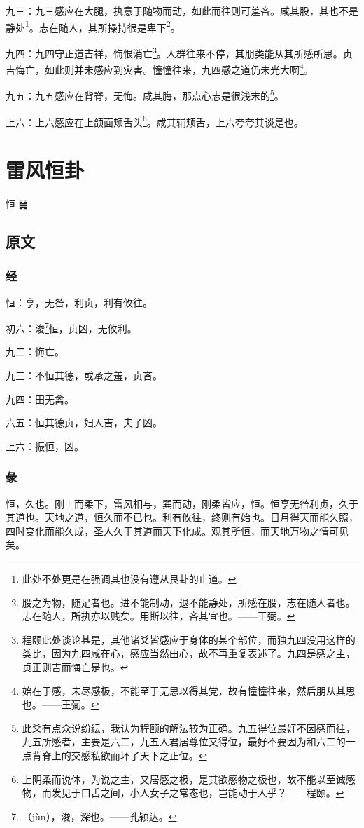 \documentclass[12pt,oneside]{book}
\begin{document}
九三：九三感应在大腿，执意于随物而动，如此而往则可羞吝。咸其股，其也不是静处\footnote{此处不处更是在强调其也没有遵从艮卦的止道。}。志在随人，其所操持很是卑下\footnote{股之为物，随足者也。进不能制动，退不能静处，所感在股，志在随人者也。志在随人，所执亦以贱矣。用斯以往，吝其宜也。——王弼。}。

九四：九四守正道吉祥，悔恨消亡\footnote{程颐此处谈论甚是，其他诸爻皆感应于身体的某个部位，而独九四没用这样的类比，因为九四咸在心，感应当然由心，故不再重复表述了。九四是感之主，贞正则吉而悔亡是也。}。人群往来不停，其朋类能从其所感所思。贞吉悔亡，如此则并未感应到灾害。憧憧往来，九四感之道仍未光大啊\footnote{始在于感，未尽感极，不能至于无思以得其党，故有憧憧往来，然后朋从其思也。——王弼。}。

九五：九五感应在背脊，无悔。咸其脢，那点心志是很浅末的\footnote{此爻有点众说纷纭，我认为程颐的解法较为正确。九五得位最好不因感而往，九五所感者，主要是六二，九五人君居尊位又得位，最好不要因为和六二的一点背脊上的交感私欲而坏了天下之正位。}。

上六：上六感应在上颌面颊舌头\footnote{上阴柔而说体，为说之主，又居感之极，是其欲感物之极也，故不能以至诚感物，而发见于口舌之间，小人女子之常态也，岂能动于人乎？——程颐。}。咸其辅颊舌，上六夸夸其谈是也。

\chapter{雷风恒卦}
恒 {\Large ䷟}

\section{原文}

\subsection{经}
恒：亨，无咎，利贞，利有攸往。

初六：浚\footnote{（jùn），浚，深也。——孔颖达。}恒，贞凶，无攸利。

九二：悔亡。

九三：不恒其德，或承之羞，贞吝。

九四：田无禽。

六五：恒其德贞，妇人吉，夫子凶。

上六：振恒，凶。

\subsection{彖}
恒，久也。刚上而柔下，雷风相与，巽而动，刚柔皆应，恒。恒亨无咎利贞，久于其道也。天地之道，恒久而不已也。利有攸往，终则有始也。日月得天而能久照，四时变化而能久成，圣人久于其道而天下化成。观其所恒，而天地万物之情可见矣。
\end{document}
